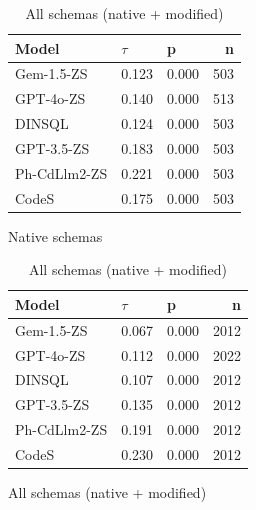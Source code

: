 \begin{table}
  \centering
  \caption{Kendall-Tau ($\tau$) Correlations between \emph{Regular Identifier Proportion} and \emph{Query f1}.}
  \begin{subfigure}{.5\linewidth}
      \centering
      \caption{Native schemas}
      \begin{tabular}{lllr}
\toprule
Model & $\tau$ & p & n \\
\midrule
Gem-1.5-ZS & 0.123 & 0.000 & 503 \\
GPT-4o-ZS & 0.140 & 0.000 & 513 \\
DINSQL & 0.124 & 0.000 & 503 \\
GPT-3.5-ZS & 0.183 & 0.000 & 503 \\
Ph-CdLlm2-ZS & 0.221 & 0.000 & 503 \\
CodeS & 0.175 & 0.000 & 503 \\
\bottomrule
\end{tabular}

      \label{table:nathigh-f1-ktau-native}
  \end{subfigure}%
  \begin{subfigure}{.5\linewidth}
      \centering
      \caption{All schemas (native + modified)}
      \begin{tabular}{lllr}
\toprule
Model & $\tau$ & p & n \\
\midrule
Gem-1.5-ZS & 0.067 & 0.000 & 2012 \\
GPT-4o-ZS & 0.112 & 0.000 & 2022 \\
DINSQL & 0.107 & 0.000 & 2012 \\
GPT-3.5-ZS & 0.135 & 0.000 & 2012 \\
Ph-CdLlm2-ZS & 0.191 & 0.000 & 2012 \\
CodeS & 0.230 & 0.000 & 2012 \\
\bottomrule
\end{tabular}

      \label{table:nathigh-f1-ktau-all}
  \end{subfigure}
\end{table}

